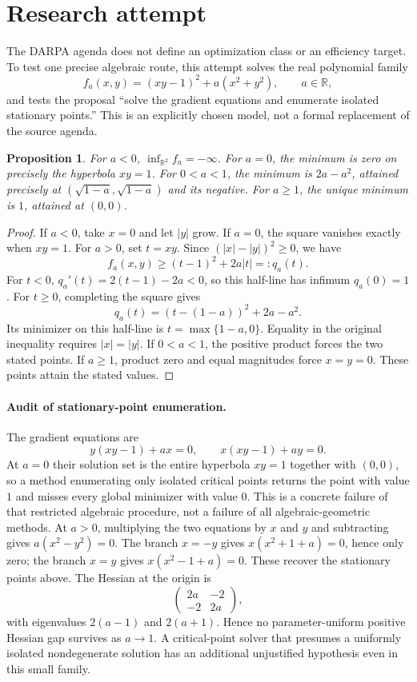 \documentclass[11pt]{article}
\newtheorem{proposition}{Proposition}
\begin{document}
\section{Research attempt}
The DARPA agenda does not define an optimization class or an efficiency target. To test one precise algebraic route, this attempt solves the real polynomial family
\[
 f_a(x,y)=(xy-1)^2+a(x^2+y^2),\qquad a\in\mathbb R,
\]
and tests the proposal ``solve the gradient equations and enumerate isolated stationary points.'' This is an explicitly chosen model, not a formal replacement of the source agenda.

\begin{proposition}
For $a<0$, $\inf_{\mathbb R^2}f_a=-\infty$. For $a=0$, the minimum is zero on precisely the hyperbola $xy=1$. For $0<a<1$, the minimum is $2a-a^2$, attained precisely at $(\sqrt{1-a},\sqrt{1-a})$ and its negative. For $a\ge1$, the unique minimum is $1$, attained at $(0,0)$.
\end{proposition}
\begin{proof}
If $a<0$, take $x=0$ and let $|y|$ grow. If $a=0$, the square vanishes exactly when $xy=1$. For $a>0$, set $t=xy$. Since $(|x|-|y|)^2\ge0$, we have
\[
 f_a(x,y)\ge (t-1)^2+2a|t|=:q_a(t).
\]
For $t<0$, $q_a'(t)=2(t-1)-2a<0$, so this half-line has infimum $q_a(0)=1$. For $t\ge0$, completing the square gives
\[
 q_a(t)=(t-(1-a))^2+2a-a^2.
\]
Its minimizer on this half-line is $t=\max\{1-a,0\}$. Equality in the original inequality requires $|x|=|y|$. If $0<a<1$, the positive product forces the two stated points. If $a\ge1$, product zero and equal magnitudes force $x=y=0$. These points attain the stated values.
\end{proof}

\paragraph{Audit of stationary-point enumeration.}
The gradient equations are
\[
 y(xy-1)+ax=0,\qquad x(xy-1)+ay=0.
\]
At $a=0$ their solution set is the entire hyperbola $xy=1$ together with $(0,0)$, so a method enumerating only isolated critical points returns the point with value $1$ and misses every global minimizer with value $0$. This is a concrete failure of that restricted algebraic procedure, not a failure of all algebraic-geometric methods. At $a>0$, multiplying the two equations by $x$ and $y$ and subtracting gives $a(x^2-y^2)=0$. The branch $x=-y$ gives $x(x^2+1+a)=0$, hence only zero; the branch $x=y$ gives $x(x^2-1+a)=0$. These recover the stationary points above. The Hessian at the origin is
\[
 \begin{pmatrix}2a&-2\\-2&2a\end{pmatrix},
\]
with eigenvalues $2(a-1)$ and $2(a+1)$. Hence no parameter-uniform positive Hessian gap survives as $a\to1$. A critical-point solver that presumes a uniformly isolated nondegenerate solution has an additional unjustified hypothesis even in this small family.
\end{document}
